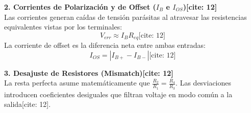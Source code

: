 \documentclass[11pt, a4paper]{article}
\begin{document}
\textbf{2. Corrientes de Polarización y de Offset ($I_B$ e $I_{OS}$)[cite: 12]} \\
Las corrientes generan caídas de tensión parásitas al atravesar las resistencias equivalentes vistas por los terminales:
\begin{equation*}
    V_{err} \approx I_B R_{eq} \text{[cite: 12]}
\end{equation*}
La corriente de offset es la diferencia neta entre ambas entradas:
\begin{equation*}
    I_{OS} = |I_{B+} - I_{B-}| \text{[cite: 12]}
\end{equation*}

\textbf{3. Desajuste de Resistores (Mismatch)[cite: 12]} \\
La resta perfecta asume matemáticamente que $\frac{R_2}{R_1} = \frac{R_4}{R_3}$. Las desviaciones introducen coeficientes desiguales que filtran voltaje en modo común a la salida[cite: 12].
\end{document}
